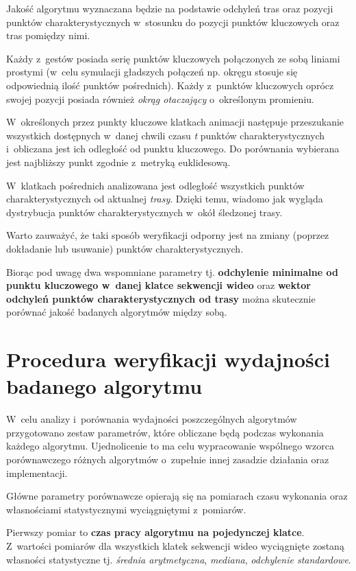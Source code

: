     Jakość algorytmu wyznaczana będzie na podstawie odchyleń tras oraz pozycji punktów charakterystycznych w~stosunku do pozycji punktów kluczowych oraz tras pomiędzy nimi.

    Każdy z~gestów posiada serię punktów kluczowych połączonych ze sobą liniami prostymi (w~celu symulacji gładszych połączeń np. okręgu stosuje się odpowiednią ilość punktów pośrednich). Każdy z~punktów kluczowych oprócz swojej pozycji posiada również \textit{okrąg otaczający} o~określonym promieniu.

    W~określonych przez punkty kluczowe klatkach animacji następuje przeszukanie wszystkich dostępnych w~danej chwili czasu \textit{t} punktów charakterystycznych i~obliczana jest ich odległość od punktu kluczowego. Do porównania wybierana jest najbliższy punkt zgodnie z~metryką euklidesową.

    W~klatkach pośrednich analizowana jest odległość wszystkich punktów charakterystycznych od aktualnej \textit{trasy}. Dzięki temu, wiadomo jak wygląda dystrybucja punktów charakterystycznych w~okół śledzonej trasy.

    Warto zauważyć, że taki sposób weryfikacji odporny jest na zmiany (poprzez dokładanie lub usuwanie) punktów charakterystycznych.

    Biorąc pod uwagę dwa wspomniane parametry tj. \textbf{odchylenie minimalne od punktu kluczowego w~danej klatce sekwencji wideo} oraz \textbf{wektor odchyleń punktów charakterystycznych od trasy} można skutecznie porównać jakość badanych algorytmów między sobą.

  \section{Procedura weryfikacji wydajności badanego algorytmu}\label{Section_Wydajnosc}

    W~celu analizy i~porównania wydajności poszczególnych algorytmów przygotowano zestaw parametrów, które obliczane będą podczas wykonania każdego algorytmu. Ujednolicenie to ma celu wypracowanie wspólnego wzorca porównawczego różnych algorytmów o~zupełnie innej zasadzie działania oraz implementacji.

    Główne parametry porównawcze opierają się na pomiarach czasu wykonania oraz własnościami statystycznymi wyciągniętymi z~pomiarów.

    Pierwszy pomiar to \textbf{czas pracy algorytmu na pojedynczej klatce}. Z~wartości pomiarów dla wszystkich klatek sekwencji wideo wyciągnięte zostaną własności statystyczne tj. \textit{średnia arytmetyczna}, \textit{mediana}, \textit{odchylenie standardowe}.

